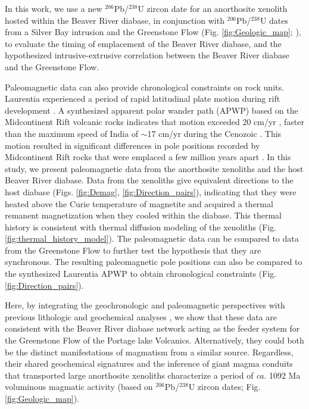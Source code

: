 In this work, we use a new $^{206}$Pb/$^{238}$U zircon date for an anorthosite xenolith hosted within the Beaver River diabase, in conjunction with $^{206}$Pb/$^{238}$U dates from a Silver Bay intrusion and the Greenstone Flow (Fig. \ref{fig:Geologic_map}; ), to evaluate the timing of emplacement of the Beaver River diabase, and the hypothesized intrusive-extrusive correlation between the Beaver River diabase and the Greenstone Flow.

Paleomagnetic data can also provide chronological constraints on rock units. Laurentia experienced a period of rapid latitudinal plate motion during rift development \cite{Swanson-Hysell2009a}. A synthesized apparent polar wander path (APWP) based on the Midcontinent Rift volcanic rocks indicates that motion exceeded 20 cm/yr \cite{Swanson-Hysell2019a}, faster than the maximum speed of India of $\sim$17 cm/yr during the Cenozoic \cite{Hinsbergen2011a}. This motion resulted in significant differences in pole positions recorded by Midcontinent Rift rocks that were emplaced a few million years apart \cite{Swanson-Hysell2019a}. In this study, we present paleomagnetic data from the anorthosite xenoliths and the host Beaver River diabase. Data from the xenoliths give equivalent directions to the host diabase (Figs. \ref{fig:Demag}, \ref{fig:Direction_pairs}), indicating that they were heated above the Curie temperature of magnetite and acquired a thermal remanent magnetization when they cooled within the diabase. This thermal history is consistent with thermal diffusion modeling of the xenoliths (Fig. \ref{fig:thermal_history_model}). The paleomagnetic data can be compared to data from the Greenstone Flow to further test the hypothesis that they are synchronous. The resulting paleomagnetic pole positions can also be compared to the synthesized Laurentia APWP to obtain chronological constraints (Fig. \ref{fig:Direction_pairs}).

Here, by integrating the geochronologic and paleomagnetic perspectives with previous lithologic and geochemical analyses \cite{Miller1997a, Doyle2016a}, we show that these data are consistent with the Beaver River diabase network acting as the feeder system for the Greenstone Flow of the Portage lake Volcanics. Alternatively, they could both be the distinct manifestations of magmatism from a similar source. Regardless, their shared geochemical signatures and the inference of giant magma conduits that transported large anorthosite xenoliths characterize a period of \textit{ca.} 1092 Ma voluminous magmatic activity (based on $^{206}$Pb/$^{238}$U zircon dates; Fig. \ref{fig:Geologic_map}).

